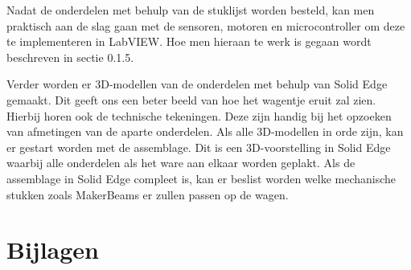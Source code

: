 \documentclass[a4paper,twoside,kulak]{kulakreport} %
\begin{document}
Nadat de onderdelen met behulp van de stuklijst worden besteld, kan men praktisch aan de slag gaan met de sensoren, motoren en microcontroller om deze te implementeren in LabVIEW. Hoe men hieraan te werk is gegaan wordt beschreven in sectie 0.1.5.

Verder worden er 3D-modellen van de onderdelen met behulp van Solid Edge gemaakt. Dit geeft ons een beter beeld van hoe het wagentje eruit zal zien. Hierbij horen ook de technische tekeningen. Deze zijn handig bij het opzoeken van afmetingen van de aparte onderdelen. Als alle 3D-modellen in orde zijn, kan er gestart worden met de assemblage. Dit is een 3D-voorstelling in Solid Edge waarbij alle onderdelen als het ware aan elkaar worden geplakt. Als de assemblage in Solid Edge compleet is, kan er beslist worden welke mechanische stukken zoals MakerBeams er zullen passen op de wagen.
\label{Planning}



\newpage

\section{Bijlagen}
\label{financieel rapport}






\end{document}
